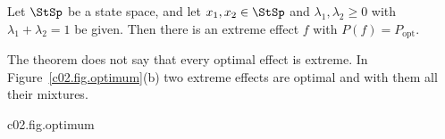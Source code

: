 \begin{theorem}\label{c02.thm.extremal}
  Let $\StSp$ be a state space, and let $x_1, x_2 \in \StSp$ and
  $\lambda_1, \lambda_2 \geq 0$ with $\lambda_1 + \lambda_2 = 1$ be given. Then there is an
  extreme effect $f$ with $P(f) = P_{\mathrm{opt}}$.
\end{theorem}

The theorem does not say that every optimal effect is extreme. In
Figure~\ref{c02.fig.optimum}(b) two extreme effects are optimal and with them all their
mixtures.

\begin{tpcfigure}{c02.fig.optimum}
  \caption{The success probability $P$ as a function on the effect set; the thin lines are
    level lines of $P$. (a) Classical bit with $x_1 = (\tfrac34, \tfrac14)$,
    $x_2 = (\tfrac14, \tfrac34)$ and $\lambda_1 = \lambda_2 = \tfrac12$: here
    $P = \tfrac12 + \tfrac14(q_0 - q_1)$, and the largest value $\tfrac34$ is taken only in
    the corner $(1,0)$. (b) Square bit with $x_1 = (1,1)$, $x_2 = (-1,-1)$ and
    $\lambda_1 = \lambda_2 = \tfrac12$: here $P = \tfrac12 + a_x + a_y$ independently of
    $b$; drawn is the section $b = \tfrac12$ through the double pyramid. The largest value
    $1$ is taken on the whole edge between $f_x^{+}$ and $f_y^{+}$. Optimal extreme effects
    are circled.}
\end{tpcfigure}

